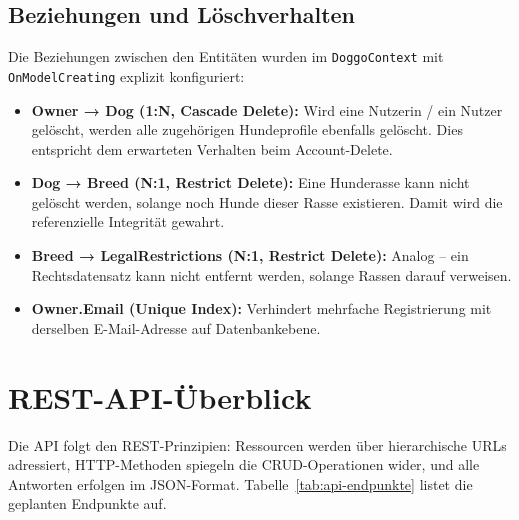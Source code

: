 \subsection{Beziehungen und Löschverhalten}
\label{subsec:beziehungen}

Die Beziehungen zwischen den Entitäten wurden im \texttt{DoggoContext} mit \texttt{OnModelCreating}
explizit konfiguriert:

\begin{itemize}
  \item \textbf{Owner → Dog (1:N, Cascade Delete):} Wird eine Nutzerin / ein Nutzer gelöscht,
    werden alle zugehörigen Hundeprofile ebenfalls gelöscht. Dies entspricht dem erwarteten
    Verhalten beim Account-Delete.
  \item \textbf{Dog → Breed (N:1, Restrict Delete):} Eine Hunderasse kann nicht gelöscht
    werden, solange noch Hunde dieser Rasse existieren. Damit wird die referenzielle
    Integrität gewahrt.
  \item \textbf{Breed → LegalRestrictions (N:1, Restrict Delete):} Analog – ein
    Rechtsdatensatz kann nicht entfernt werden, solange Rassen darauf verweisen.
  \item \textbf{Owner.Email (Unique Index):} Verhindert mehrfache Registrierung mit
    derselben E-Mail-Adresse auf Datenbankebene.
\end{itemize}

\section{REST-API-Überblick}
\label{sec:api-ueberblick}

Die API folgt den REST-Prinzipien: Ressourcen werden über hierarchische URLs adressiert,
HTTP-Methoden spiegeln die CRUD-Operationen wider, und alle Antworten erfolgen im
JSON-Format. Tabelle~\ref{tab:api-endpunkte} listet die geplanten Endpunkte auf.


